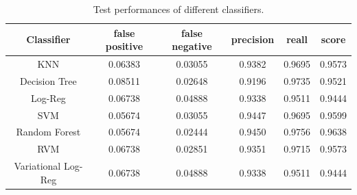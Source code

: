 \documentclass{article}
\begin{document}
\begin{table}[!t]
  \renewcommand{\arraystretch}{1.3}
  \caption{Test performances of different classifiers.}
  \label{table:comparison}
  \centering
  \begin{tabular}{c|ccccc}
    \hline
    Classifier & false positive & false negative & precision & reall & score
    \\
    \hline
    KNN & 0.06383 & 0.03055 & 0.9382 & 0.9695 & 0.9573 \\
    Decision Tree & 0.08511 &  0.02648 & 0.9196 & 0.9735 & 0.9521 \\
    Log-Reg & 0.06738 & 0.04888 & 0.9338 & 0.9511 & 0.9444 \\
    SVM & 0.05674 & 0.03055 & 0.9447 & 0.9695 & 0.9599 \\
    Random Forest & 0.05674 & 0.02444 & 0.9450 & 0.9756 & 0.9638 \\
    RVM & 0.06738 & 0.02851 & 0.9351 & 0.9715 & 0.9573 \\
    Variational Log-Reg & 0.06738 & 0.04888 & 0.9338 & 0.9511 & 0.9444 \\
    \hline
  \end{tabular}
\end{table}


%
%



\end{document}
